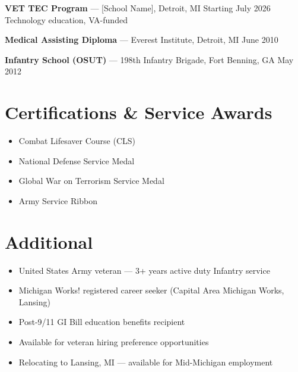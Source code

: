 \documentclass[11pt,letterpaper]{article}
\begin{document}
\textbf{VET TEC Program} --- [School Name], Detroit, MI \hfill Starting July 2026\\
Technology education, VA-funded

\medskip

\textbf{Medical Assisting Diploma} --- Everest Institute, Detroit, MI \hfill June 2010

\medskip

\textbf{Infantry School (OSUT)} --- 198th Infantry Brigade, Fort Benning, GA \hfill May 2012

\section{Certifications \& Service Awards}

\begin{minipage}[t]{0.48\textwidth}
\begin{itemize}
  \item Combat Lifesaver Course (CLS)
  \item National Defense Service Medal
\end{itemize}
\end{minipage}
\hfill
\begin{minipage}[t]{0.48\textwidth}
\begin{itemize}
  \item Global War on Terrorism Service Medal
  \item Army Service Ribbon
\end{itemize}
\end{minipage}

\section{Additional}

\begin{itemize}
  \item United States Army veteran --- 3+ years active duty Infantry service
  \item Michigan Works! registered career seeker (Capital Area Michigan Works, Lansing)
  \item Post-9/11 GI Bill education benefits recipient
  \item Available for veteran hiring preference opportunities
  \item Relocating to Lansing, MI --- available for Mid-Michigan employment
\end{itemize}
\end{document}
